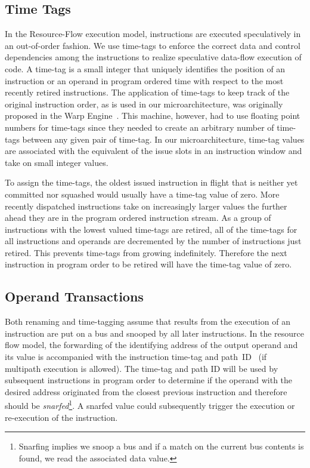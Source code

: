 \documentclass[10pt,twocolumn]{IEEEtran}
\begin{document}
\subsection{Time Tags}

In the Resource-Flow execution model, instructions are executed
speculatively in an out-of-order fashion.  We use time-tags to enforce
the correct data and control dependencies among the instructions to
realize speculative data-flow execution of code.  A time-tag is a small
integer that uniquely identifies the position of an instruction or an
operand in program ordered time with respect to the most recently
retired instructions.
%
%
The application of time-tags to keep track of the original instruction 
order, as is used in our microarchitecture, was originally 
proposed in the Warp Engine~\cite{Cleary95}.
This machine, however, had to use floating point numbers
for time-tags since they needed to create an arbitrary number of time-tags
between any given pair of time-tag.  
In our microarchitecture, 
time-tag values are associated with
the equivalent of
the issue slots in an instruction window and
take on small integer values.

To assign the time-tags, the oldest issued instruction in flight that
is neither yet committed nor squashed would usually have a time-tag
value of zero.  More recently dispatched instructions take on
increasingly larger values the further ahead they are in the program
ordered instruction stream.  As a group of instructions with the lowest
valued time-tags are retired, all of the time-tags for all instructions
and operands are decremented by the number of instructions just
retired.  
This prevents time-tags from
growing indefinitely.
Therefore the next instruction in program order to be retired will
have the time-tag value of zero.
%
%
\subsection{Operand Transactions}
%
Both renaming and time-tagging assume that results from the execution
of an instruction are put on a bus and snooped by all later
instructions. 
In the resource flow model, the forwarding of the
identifying address of the output operand and its value is
accompanied with the instruction time-tag and
path~ID~\cite{Skadron01} (if multipath execution is allowed).  
The
time-tag and path ID will be used by subsequent instructions in
program order to determine if the operand with the desired
address originated from the closest previous
instruction and therefore should be \emph{snarfed}\footnote{Snarfing 
implies we snoop a bus and if a match on the current bus contents is
found, we read the associated data value.}.
A snarfed
value could subsequently trigger the execution or re-execution of
the instruction.
\end{document}
